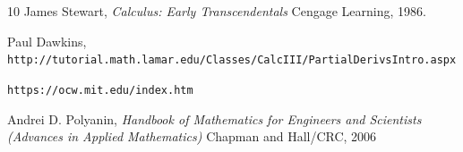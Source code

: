 \documentclass[a4paper]{article}
\begin{document}
\begin{thebibliography}{10}
	James Stewart,
	\textit{Calculus: Early Transcendentals}
	Cengage Learning, 1986.

	Paul Dawkins, \\\texttt{http://tutorial.math.lamar.edu/Classes/CalcIII/PartialDerivsIntro.aspx}

	\texttt{https://ocw.mit.edu/index.htm}

	Andrei D. Polyanin,
	\textit{Handbook of Mathematics for Engineers and Scientists (Advances in Applied Mathematics)}
	Chapman and Hall/CRC, 2006
\end{thebibliography}
\end{document}
